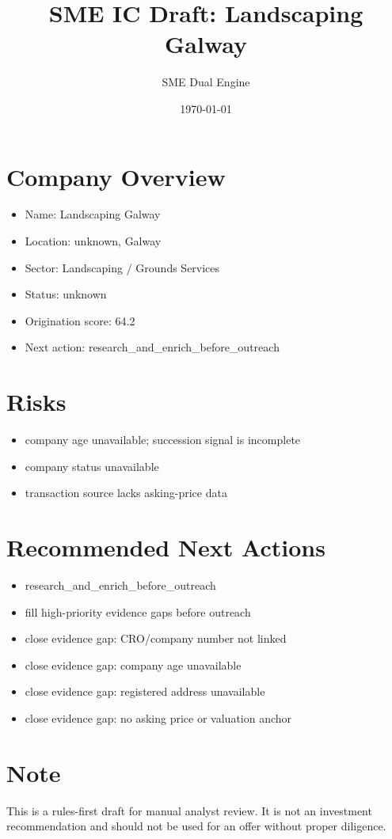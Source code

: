\documentclass[11pt,a4paper]{article}
\title{SME IC Draft: Landscaping Galway}
\author{SME Dual Engine}
\date{\today}
\begin{document}
\maketitle
\section*{Company Overview}
\begin{itemize}[leftmargin=1.4em]
\item Name: Landscaping Galway
\item Location: unknown, Galway
\item Sector: Landscaping / Grounds Services
\item Status: unknown
\item Origination score: 64.2
\item Next action: research\_and\_enrich\_before\_outreach
\end{itemize}
\section*{Risks}
\begin{itemize}[leftmargin=1.4em]
\item company age unavailable; succession signal is incomplete
\item company status unavailable
\item transaction source lacks asking-price data
\end{itemize}
\section*{Recommended Next Actions}
\begin{itemize}[leftmargin=1.4em]
\item research\_and\_enrich\_before\_outreach
\item fill high-priority evidence gaps before outreach
\item close evidence gap: CRO/company number not linked
\item close evidence gap: company age unavailable
\item close evidence gap: registered address unavailable
\item close evidence gap: no asking price or valuation anchor
\end{itemize}
\section*{Note}
This is a rules-first draft for manual analyst review. It is not an investment
recommendation and should not be used for an offer without proper diligence.
\end{document}
